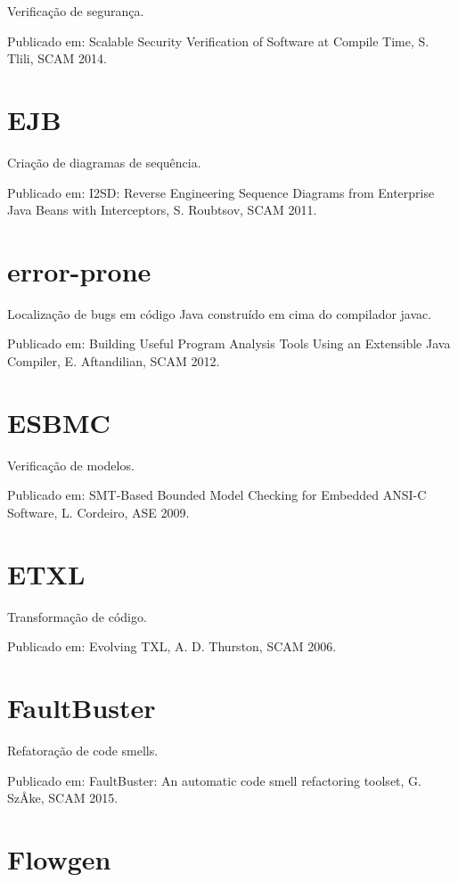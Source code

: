 Verificação de segurança.

Publicado em: Scalable Security Verification of Software at Compile Time,
S. Tlili,
SCAM
2014.

\section{EJB}

Criação de diagramas de sequência.

Publicado em: I2SD: Reverse Engineering Sequence Diagrams from Enterprise Java Beans with Interceptors,
S. Roubtsov,
SCAM
2011.

\section{error-prone}

Localização de bugs em código Java construído em cima do compilador javac.

Publicado em: Building Useful Program Analysis Tools Using an Extensible Java Compiler,
E. Aftandilian,
SCAM
2012.

\section{ESBMC}

Verificação de modelos.

Publicado em: SMT-Based Bounded Model Checking for Embedded ANSI-C Software,
L. Cordeiro,
ASE
2009.

\section{ETXL}

Transformação de código.

Publicado em: Evolving TXL,
A. D. Thurston,
SCAM
2006.

\section{FaultBuster}

Refatoração de code smells.

Publicado em: FaultBuster: An automatic code smell refactoring toolset,
G. SzÅke,
SCAM
2015.

\section{Flowgen}

